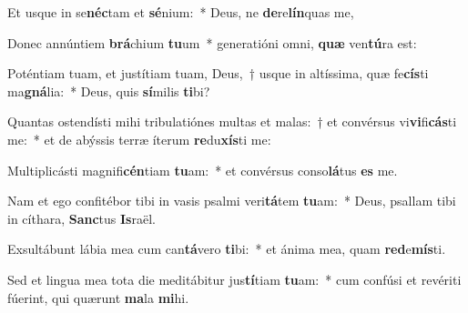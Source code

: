 \item Et usque in se\textbf{néc}tam et \textbf{sé}nium:~* Deus, ne \textbf{de}re\textbf{lín}quas me,
\item Donec annúntiem \textbf{brá}chium \textbf{tu}um~* generatióni omni, \textbf{quæ} ven\textbf{tú}ra est:
\item Poténtiam tuam, et justítiam tuam, Deus,~† usque in altíssima, quæ fe\textbf{cís}ti ma\textbf{gná}lia:~* Deus, quis \textbf{sí}milis \textbf{ti}bi?
\item Quantas ostendísti mihi tribulatiónes multas et malas:~† et convérsus vi\textbf{vi}fi\textbf{cás}ti me:~* et de abýssis terræ íterum \textbf{re}du\textbf{xís}ti me:
\item Multiplicásti magnifi\textbf{cén}tiam \textbf{tu}am:~* et convérsus conso\textbf{lá}tus \textbf{es} me.
\item Nam et ego confitébor tibi in vasis psalmi veri\textbf{tá}tem \textbf{tu}am:~* Deus, psallam tibi in cíthara, \textbf{Sanc}tus \textbf{Is}raël.
\item Exsultábunt lábia mea cum can\textbf{tá}vero \textbf{ti}bi:~* et ánima mea, quam \textbf{red}e\textbf{mís}ti.
\item Sed et lingua mea tota die meditábitur jus\textbf{tí}tiam \textbf{tu}am:~* cum confúsi et revériti fúerint, qui quærunt \textbf{ma}la \textbf{mi}hi.
